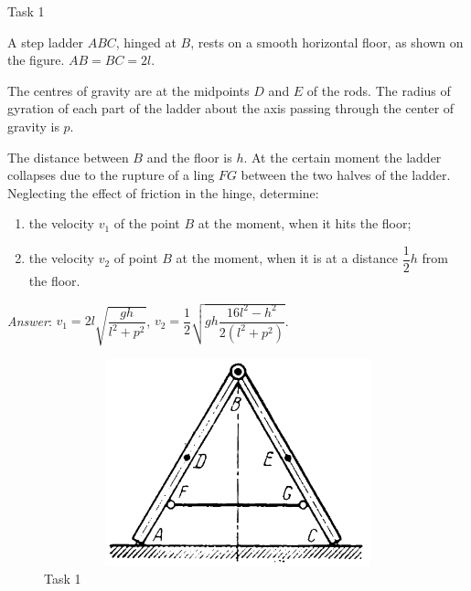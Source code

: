 \documentclass[aspectratio=169]{beamer}
\begin{document}
\begin{frame}[t]{Task 1}
  \scriptsize
    \begin{minipage}{0.65\textwidth}
      A step ladder $ABC$, hinged at $B$, rests on a smooth horizontal floor, as shown on the figure. $AB=BC=2l$.
  
      The centres of gravity are at the midpoints $D$ and $E$ of the rods. The radius of gyration of each part of the ladder about the axis passing through the center of gravity is $p$.
  
      The distance between $B$ and the floor is $h$. At the certain moment the ladder collapses due to the rupture of a ling $FG$ between the two halves of the ladder. Neglecting the effect of friction in the hinge, determine:
      \begin{enumerate}
          \item the velocity $v_1$ of the point $B$ at the moment, when it hits the floor;
          \item the velocity $v_2$ of point $B$ at the moment, when it is at a distance $\dfrac{1}{2}h$ from the floor.
      \end{enumerate}
      \smallskip
  
      \textit{Answer}: $v_1=2l\sqrt{\dfrac{gh}{l^2+p^2}}$, $v_2 = \dfrac{1}{2}\sqrt{gh\dfrac{16l^2-h^2}{2(l^2+p^2)}}$.
    \end{minipage}
    \begin{minipage}{0.34\textwidth}
      \begin{figure}[H]
        \centering\includegraphics[height=6cm,width=1\textwidth,keepaspectratio]{HW7_1}
        \caption*{Task 1}
      \end{figure}
    \end{minipage}
  \end{frame}
\end{document}
